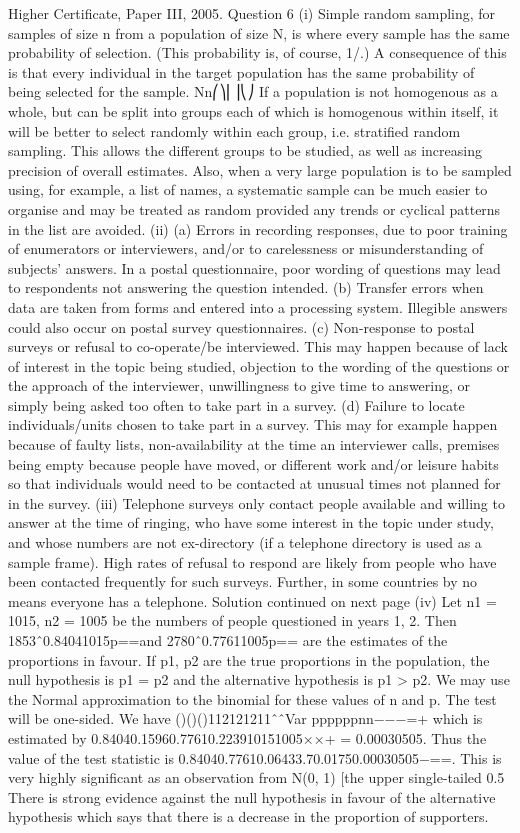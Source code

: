 Higher Certificate, Paper III, 2005. Question 6
(i) Simple random sampling, for samples of size n from a population of size N, is where every sample has the same probability of selection. (This probability is, of course, 1/.) A consequence of this is that every individual in the target population has the same probability of being selected for the sample. Nn⎛⎞⎜⎟⎝⎠
If a population is not homogenous as a whole, but can be split into groups each of which is homogenous within itself, it will be better to select randomly within each group, i.e. stratified random sampling. This allows the different groups to be studied, as well as increasing precision of overall estimates. Also, when a very large population is to be sampled using, for example, a list of names, a systematic sample can be much easier to organise and may be treated as random provided any trends or cyclical patterns in the list are avoided.
(ii) (a) Errors in recording responses, due to poor training of enumerators or interviewers, and/or to carelessness or misunderstanding of subjects' answers. In a postal questionnaire, poor wording of questions may lead to respondents not answering the question intended.
(b) Transfer errors when data are taken from forms and entered into a processing system. Illegible answers could also occur on postal survey questionnaires.
(c) Non-response to postal surveys or refusal to co-operate/be interviewed. This may happen because of lack of interest in the topic being studied, objection to the wording of the questions or the approach of the interviewer, unwillingness to give time to answering, or simply being asked too often to take part in a survey.
(d) Failure to locate individuals/units chosen to take part in a survey. This may for example happen because of faulty lists, non-availability at the time an interviewer calls, premises being empty because people have moved, or different work and/or leisure habits so that individuals would need to be contacted at unusual times not planned for in the survey.
(iii) Telephone surveys only contact people available and willing to answer at the time of ringing, who have some interest in the topic under study, and whose numbers are not ex-directory (if a telephone directory is used as a sample frame). High rates of refusal to respond are likely from people who have been contacted frequently for such surveys. Further, in some countries by no means everyone has a telephone.
Solution continued on next page
(iv) Let n1 = 1015, n2 = 1005 be the numbers of people questioned in years 1, 2. Then 1853ˆ0.84041015p==and 2780ˆ0.77611005p== are the estimates of the proportions in favour.
If p1, p2 are the true proportions in the population, the null hypothesis is p1 = p2 and the alternative hypothesis is p1 > p2. We may use the Normal approximation to the binomial for these values of n and p. The test will be one-sided.
We have
()()()112121211ˆˆVar ppppppnn−−−=+
which is estimated by 0.84040.15960.77610.223910151005××+ = 0.00030505.
Thus the value of the test statistic is
0.84040.77610.06433.70.01750.00030505−==.
This is very highly significant as an observation from N(0, 1) [the upper single-tailed 0.5%
There is strong evidence against the null hypothesis in favour of the alternative hypothesis which says that there is a decrease in the proportion of supporters.
